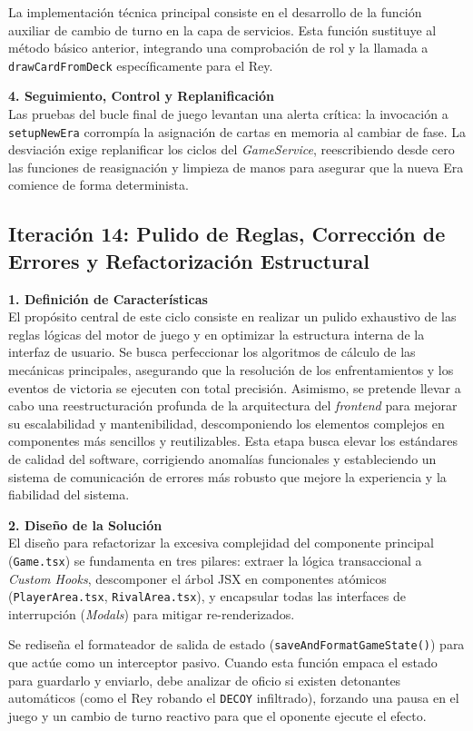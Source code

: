 La implementación técnica principal consiste en el desarrollo de la función auxiliar de cambio de turno en la capa de servicios. Esta función sustituye al método básico anterior, integrando una comprobación de rol y la llamada a \texttt{drawCardFromDeck} específicamente para el Rey.

\textbf{4. Seguimiento, Control y Replanificación} \\
Las pruebas del bucle final de juego levantan una alerta crítica: la invocación a \texttt{setupNewEra} corrompía la asignación de cartas en memoria al cambiar de fase. La desviación exige replanificar los ciclos del \textit{GameService}, reescribiendo desde cero las funciones de reasignación y limpieza de manos para asegurar que la nueva Era comience de forma determinista.

\subsection{Iteración 14: Pulido de Reglas, Corrección de Errores y Refactorización Estructural }

\textbf{1. Definición de Características} \\
El propósito central de este ciclo consiste en realizar un pulido exhaustivo de las reglas lógicas del motor de juego y en optimizar la estructura interna de la interfaz de usuario. Se busca perfeccionar los algoritmos de cálculo de las mecánicas principales, asegurando que la resolución de los enfrentamientos y los eventos de victoria se ejecuten con total precisión. Asimismo, se pretende llevar a cabo una reestructuración profunda de la arquitectura del \textit{frontend} para mejorar su escalabilidad y mantenibilidad, descomponiendo los elementos complejos en componentes más sencillos y reutilizables. Esta etapa busca elevar los estándares de calidad del software, corrigiendo anomalías funcionales y estableciendo un sistema de comunicación de errores más robusto que mejore la experiencia y la fiabilidad del sistema.

\textbf{2. Diseño de la Solución} \\
El diseño para refactorizar la excesiva complejidad del componente principal (\texttt{Game.tsx}) se fundamenta en tres pilares: extraer la lógica transaccional a \textit{Custom Hooks}, descomponer el árbol JSX en componentes atómicos (\texttt{PlayerArea.tsx}, \texttt{RivalArea.tsx}), y encapsular todas las interfaces de interrupción (\textit{Modals}) para mitigar re-renderizados.

Se rediseña el formateador de salida de estado (\texttt{saveAndFormatGameState()}) para que actúe como un interceptor pasivo. Cuando esta función empaca el estado para guardarlo y enviarlo, debe analizar de oficio si existen detonantes automáticos (como el Rey robando el \texttt{DECOY} infiltrado), forzando una pausa en el juego y un cambio de turno reactivo para que el oponente ejecute el efecto.

